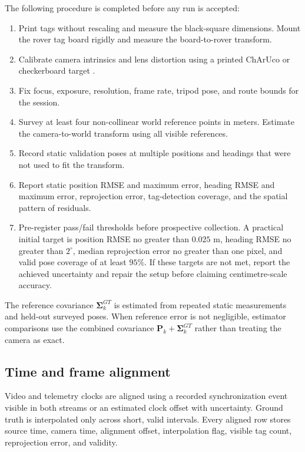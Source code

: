 \documentclass[11pt,a4paper]{article}
\begin{document}
The following procedure is completed before any run is accepted:
\begin{enumerate}
  \item Print tags without rescaling and measure the black-square dimensions.
  Mount the rover tag board rigidly and measure the board-to-rover transform.
  \item Calibrate camera intrinsics and lens distortion using a printed
  ChArUco or checkerboard target \cite{zhang2000calibration}.
  \item Fix focus, exposure, resolution, frame rate, tripod pose, and route
  bounds for the session.
  \item Survey at least four non-collinear world reference points in meters.
  Estimate the camera-to-world transform using all visible references.
  \item Record static validation poses at multiple positions and headings that
  were not used to fit the transform.
  \item Report static position RMSE and maximum error, heading RMSE and maximum
  error, reprojection error, tag-detection coverage, and the spatial pattern of
  residuals.
  \item Pre-register pass/fail thresholds before prospective collection. A
  practical initial target is position RMSE no greater than $0.025$ m, heading
  RMSE no greater than $2^\circ$, median reprojection error no greater than one
  pixel, and valid pose coverage of at least $95\%$. If these targets are not
  met, report the achieved uncertainty and repair the setup before claiming
  centimetre-scale accuracy.
\end{enumerate}

The reference covariance $\boldsymbol\Sigma_k^{GT}$ is estimated from repeated
static measurements and held-out surveyed poses. When reference error is not
negligible, estimator comparisons use the combined covariance
$\mathbf P_k+\boldsymbol\Sigma_k^{GT}$ rather than treating the camera as exact.

\subsection{Time and frame alignment}

Video and telemetry clocks are aligned using a recorded synchronization event
visible in both streams or an estimated clock offset with uncertainty. Ground
truth is interpolated only across short, valid intervals. Every aligned row
stores source time, camera time, alignment offset, interpolation flag, visible
tag count, reprojection error, and validity.
\end{document}
